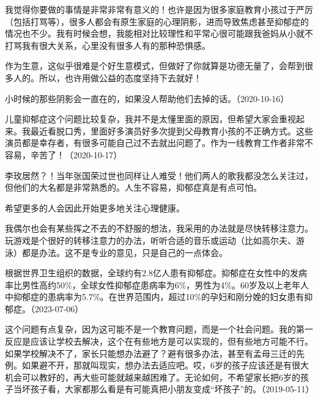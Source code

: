 我觉得你要做的事情是非常非常有意义的！也许是因为很多家庭教育小孩过于严厉（包括打骂等），很多人都会有原生家庭的心理阴影，进而导致焦虑甚至抑郁症的情况也不少。我有时候会想，我能相对比较理性和平常心很可能跟我爸妈从小就不打骂我有很大关系，心里没有很多人有的那种恐惧感。

作为生意，这似乎很难是个好生意模式，但做好了你就算是功德无量了，会帮到很多人的。所以，也许用做公益的态度坚持下去就好！


小时候的那些阴影会一直在的，如果没人帮助他们去掉的话。（2020-10-16）

儿童抑郁症这个问题比较复杂，我并不是太懂里面的原因，但希望大家会重视起来。我最近看脱口秀，里面好多演员好多次提到父母教育小孩的不正确方式。这些演员都是幸存者，有很多可能自己过不去就出问题了。作为一线教育工作者非常不容易，辛苦了！（2020-10-17）

李玫居然？！当年张国荣过世也同样让人难受！他们两人的歌我都没怎么关注过，但他们的大名都是非常熟悉的。人生不容易，抑郁症真是有点可怕。

希望更多的人会因此开始更多地关注心理健康。

我偶尔也会有某些挥之不去的不舒服的想法，我采用的办法就是尽快转移注意力。玩游戏是个很好的转移注意力的办法，听听合适的音乐或运动（比如高尔夫、游泳）都是办法。这不是专业的意见，只是自己的一点体会。

根据世界卫生组织的数据，全球约有2.8亿人患有抑郁症。抑郁症在女性中的发病率比男性高约50\%，全球女性抑郁症患病率为6\%，男性为4\%。60岁及以上老年人中抑郁症的患病率为5.7\%。在世界范围内，超过10\%的孕妇和刚分娩的妇女患有抑郁症。（2023-07-06）


这个问题有点复杂，因为这可能不是一个教育问题，而是一个社会问题。我的第一反应是应该让学校去解决，这个在有些地方是可以实现的，但有些地方可能不行。如果学校解决不了，家长只能想办法避了？避有很多办法，甚至有孟母三迁的先例。如果避不开，那就叫现实，想办法去适应吧。哎，6岁的孩子应该还是有很大机会可以教好的，再大些可能就越来越困难了。无论如何，不希望家长把6岁的孩子当坏孩子看，大家都那么看是有可能真把小朋友变成“坏孩子”的。（2019-05-11）

